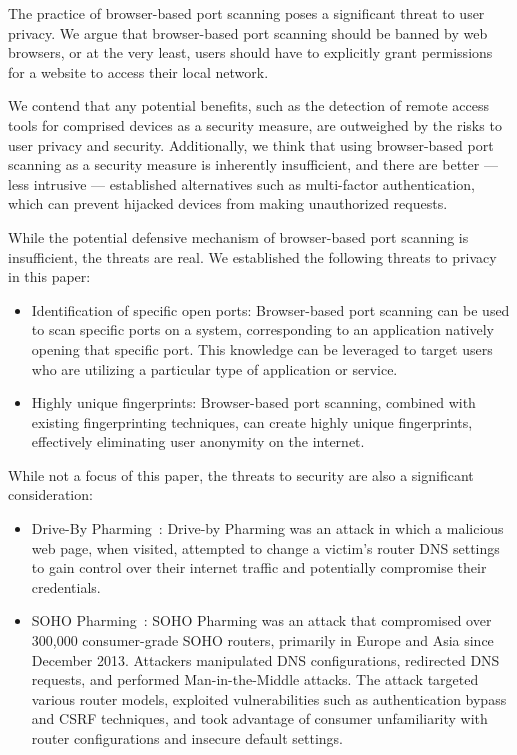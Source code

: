 The practice of browser-based port scanning poses a significant threat to user privacy. We argue that browser-based port scanning should be banned by web browsers, or at the very least, users should have to explicitly grant permissions for a website to access their local network. 

We contend that any potential benefits, such as the detection of remote access tools for comprised devices as a security measure, are outweighed by the risks to user privacy and security.
Additionally, we think that using browser-based port scanning as a security measure is inherently insufficient, and there are better --- less intrusive --- established alternatives such as multi-factor authentication, which can prevent hijacked devices from making unauthorized requests.

While the potential defensive mechanism of browser-based port scanning is insufficient, the threats are real.
We established the following threats to privacy in this paper:
\begin{itemize}
    \item Identification of specific open ports: Browser-based port scanning can be used to scan specific ports on a system, corresponding to an application natively opening that specific port. This knowledge can be leveraged to target users who are utilizing a particular type of application or service.
    \item Highly unique fingerprints: Browser-based port scanning, combined with existing fingerprinting techniques, can create highly unique fingerprints, effectively eliminating user anonymity on the internet.
\end{itemize}

While not a focus of this paper, the threats to security are also a significant consideration:
\begin{itemize}
    \item Drive-By Pharming~: Drive-by Pharming was an attack in which a malicious web page, when visited, attempted to change a victim's router DNS settings to gain control over their internet traffic and potentially compromise their credentials.
    \item SOHO Pharming~: SOHO Pharming was an attack that compromised over 300,000 consumer-grade SOHO routers, primarily in Europe and Asia since December 2013. Attackers manipulated DNS configurations, redirected DNS requests, and performed Man-in-the-Middle attacks. The attack targeted various router models, exploited vulnerabilities such as authentication bypass and CSRF techniques, and took advantage of consumer unfamiliarity with router configurations and insecure default settings.
\end{itemize}

